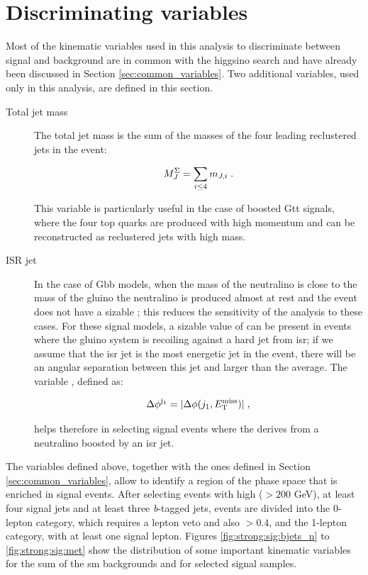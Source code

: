 \section{Discriminating variables}
\label{sec:strong:sigbkg}

Most of the kinematic variables used in this analysis to discriminate between signal and background 
are in common with the higgsino search and have already been discussed in Section \ref{sec:common_variables}.
Two additional variables, used only in this analysis, are defined in this section.

\begin{description}
\item[Total jet mass] The total jet mass is the sum of the masses of the four leading reclustered jets in the event:

\begin{equation}
M_{J}^{\Sigma} = \sum_{i \leq 4} m_{J,i} \; . \nonumber
\end{equation}

\noindent This variable is particularly useful in the case of boosted Gtt signals, where the four top quarks are produced with high momentum and can be reconstructed as reclustered jets with high mass. 

\item[ISR jet] In the case of Gbb models, when the mass of the neutralino is close to the mass of the gluino the neutralino is produced almost at rest and the event does not have a sizable \met; this reduces the sensitivity of the analysis to these cases. 
For these signal models, a sizable value of \met can be present in events where the gluino system is recoiling against a hard jet from \gls{isr}; if we assume that the \gls{isr} jet is the most energetic jet in the event, there will be an angular separation between this jet and \met larger than the average. The variable \dphilead, defined as:

\begin{equation}
{\Delta}\phi^{\mathrm{j}_1} = |{\Delta}{\phi}(j_1, E_{\rm T}^{\mathrm{miss}})| \; , \nonumber
\end{equation}

\noindent helps therefore in selecting signal events where the \met derives from a neutralino boosted by an \gls{isr} jet. 

\end{description}

The variables defined above, together with the ones defined in Section \ref{sec:common_variables},
allow to 
identify a region of the phase space that is enriched in signal events. 
After selecting events with high \met ($> 200$ GeV), at least four signal jets and at least three \textit{b}-tagged jets, events are
divided into the 0-lepton category, which requires a lepton veto and also \dphimin $>0.4$, and the 1-lepton category, 
with at least one signal lepton.
Figures \ref{fig:strong:sig:bjets_n} to \ref{fig:strong:sig:met} show the distribution of some important kinematic variables for 
the sum of the \gls{sm} backgrounds and for selected signal samples. 

